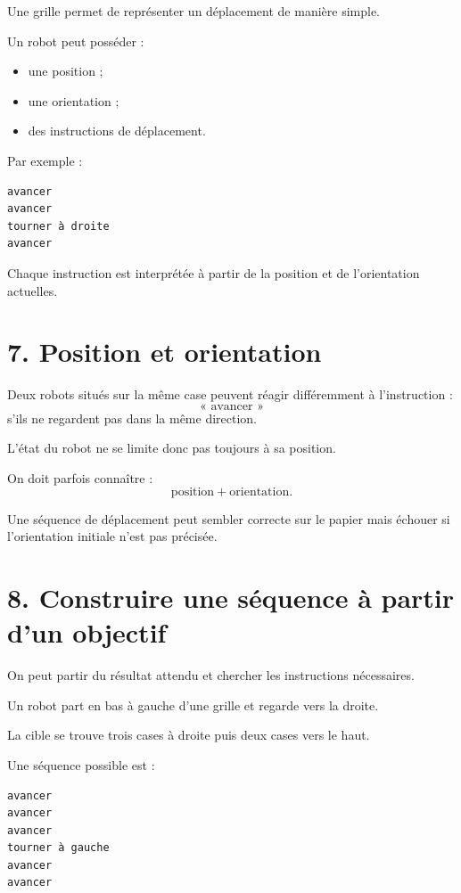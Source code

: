 Une grille permet de représenter un déplacement de manière simple.

Un robot peut posséder :
\begin{itemize}
\item une position ;
\item une orientation ;
\item des instructions de déplacement.
\end{itemize}

Par exemple :
\begin{verbatim}
avancer
avancer
tourner à droite
avancer
\end{verbatim}

Chaque instruction est interprétée à partir de la position et de l'orientation actuelles.

\section{7. Position et orientation}

Deux robots situés sur la même case peuvent réagir différemment à l'instruction :
\[
\text{« avancer »}
\]
s'ils ne regardent pas dans la même direction.

L'état du robot ne se limite donc pas toujours à sa position.

On doit parfois connaître :
\[
\text{position}+\text{orientation}.
\]

\begin{attention}
Une séquence de déplacement peut sembler correcte sur le papier mais échouer si l'orientation initiale n'est pas précisée.
\end{attention}

\section{8. Construire une séquence à partir d'un objectif}

On peut partir du résultat attendu et chercher les instructions nécessaires.

\begin{exemple}
Un robot part en bas à gauche d'une grille et regarde vers la droite.

La cible se trouve trois cases à droite puis deux cases vers le haut.

Une séquence possible est :
\begin{verbatim}
avancer
avancer
avancer
tourner à gauche
avancer
avancer
\end{verbatim}
\end{exemple}

